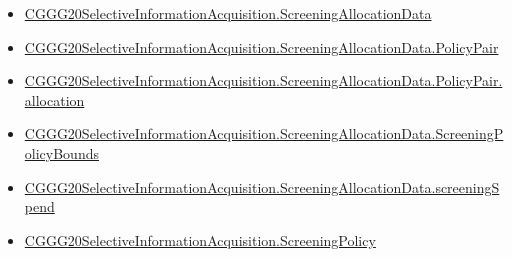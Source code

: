 \documentclass[10pt]{article}
\begin{document}
\begin{itemize}
\item \hyperlink{paper-prerequisite-f3c5f56c4a8e4ac3}{CGGG20\allowbreak{}Selective\allowbreak{}Information\allowbreak{}Acquisition.\allowbreak{}Screening\allowbreak{}Allocation\allowbreak{}Data}
\item \hyperlink{paper-prerequisite-8a6d79f3e51b72a6}{CGGG20\allowbreak{}Selective\allowbreak{}Information\allowbreak{}Acquisition.\allowbreak{}Screening\allowbreak{}Allocation\allowbreak{}Data.\allowbreak{}Policy\allowbreak{}Pair}
\item \hyperlink{governing-declaration-9408c63102b888b5}{CGGG20\allowbreak{}Selective\allowbreak{}Information\allowbreak{}Acquisition.\allowbreak{}Screening\allowbreak{}Allocation\allowbreak{}Data.\allowbreak{}Policy\allowbreak{}Pair.\allowbreak{}allocation}
\item \hyperlink{governing-declaration-ddcb7ccdba377e8d}{CGGG20\allowbreak{}Selective\allowbreak{}Information\allowbreak{}Acquisition.\allowbreak{}Screening\allowbreak{}Allocation\allowbreak{}Data.\allowbreak{}Screening\allowbreak{}Policy\allowbreak{}Bounds}
\item \hyperlink{governing-declaration-1e3e75eb414e5851}{CGGG20\allowbreak{}Selective\allowbreak{}Information\allowbreak{}Acquisition.\allowbreak{}Screening\allowbreak{}Allocation\allowbreak{}Data.\allowbreak{}screening\allowbreak{}Spend}
\item \hyperlink{paper-prerequisite-88f67c493873ffe9}{CGGG20\allowbreak{}Selective\allowbreak{}Information\allowbreak{}Acquisition.\allowbreak{}Screening\allowbreak{}Policy}
\end{itemize}
\end{document}
